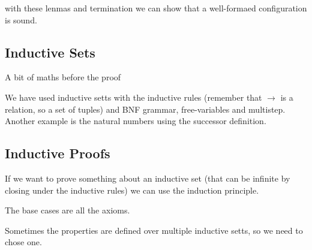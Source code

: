 
with these lenmas and termination we can show that a well-formaed configuration is sound.

\subsection{Inductive Sets}
A bit of maths before the proof


We have used inductive setts with the inductive rules (remember that $ \to $ is a relation, so a set of tuples) and BNF grammar, free-variables and multistep. Another example is the natural numbers using the successor definition.

\subsection{Inductive Proofs}
If we want to prove something about an inductive set (that can be infinite by closing under the inductive rules) we can use the induction principle.

The base cases are all the axioms.

Sometimes the properties are defined over multiple inductive setts, so we need to chose one. 
% 
